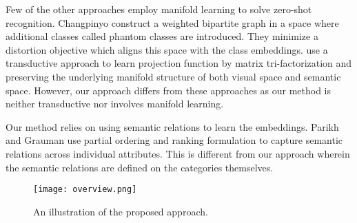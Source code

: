 \documentclass[10pt,twocolumn,letterpaper]{article}
\begin{document}
 
Few of the other approaches employ manifold learning \cite{changpinyo2016synthesized,Xu_2017_CVPR, Morgado_2017_CVPR} to solve zero-shot recognition. Changpinyo \etal \cite{changpinyo2016synthesized} construct a weighted bipartite graph in a space where additional classes called phantom classes are introduced. They minimize a distortion objective which aligns this space with the class embeddings. \cite{Xu_2017_CVPR} use a transductive approach to learn projection function by matrix tri-factorization and preserving the underlying manifold structure of both visual space and semantic space.
However, our approach differs from these approaches as our method is neither transductive nor involves manifold learning.

Our method relies on using semantic relations to learn the embeddings. Parikh and Grauman \cite{parikh2011relative} use partial ordering and ranking formulation to capture semantic relations across individual attributes. This is different from our approach wherein the semantic relations are defined on the categories themselves.
\begin{figure*}[t!]
\centering
\texttt{[image: overview.png]}
\caption{\small An illustration of the proposed approach.}
\label{main}
\end{figure*}

\end{document}
